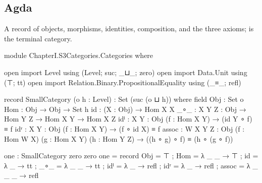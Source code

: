 \subsection*{Agda}

A record of objects, morphisms, identities, composition, and the three
axioms;  is the terminal category.

\begin{code}
module ChapterI.S3Categories.Categories where

open import Level using (Level; suc; _⊔_; zero)
open import Data.Unit using (⊤; tt)
open import Relation.Binary.PropositionalEquality using (_≡_; refl)

record SmallCategory (o h : Level) : Set (suc (o ⊔ h)) where
  field
    Obj   : Set o
    Hom   : Obj → Obj → Set h
    id    : (X : Obj) → Hom X X
    _∘_   : {X Y Z : Obj} → Hom Y Z → Hom X Y → Hom X Z
    idˡ   : {X Y : Obj} (f : Hom X Y) → (id Y ∘ f) ≡ f
    idʳ   : {X Y : Obj} (f : Hom X Y) → (f ∘ id X) ≡ f
    assoc : {W X Y Z : Obj} (f : Hom W X) (g : Hom X Y) (h : Hom Y Z) →
            ((h ∘ g) ∘ f) ≡ (h ∘ (g ∘ f))

one : SmallCategory zero zero
one = record
  { Obj   = ⊤
  ; Hom   = λ _ _ → ⊤
  ; id    = λ _ → tt
  ; _∘_   = λ _ _ → tt
  ; idˡ   = λ _ → refl
  ; idʳ   = λ _ → refl
  ; assoc = λ _ _ _ → refl
  }
\end{code}
